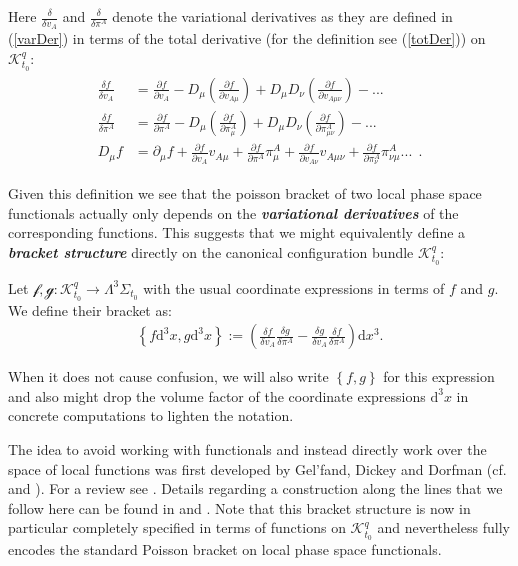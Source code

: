 Here $\frac{\delta}{\delta v_A}$ and $\frac{\delta}{\delta \pi^A}$ denote the variational derivatives as they are defined in (\ref{varDer}) in terms of the total derivative (for the definition see (\ref{totDer})) on $\mathcal{K}^q_{t_0}$:
\begin{align}
    \begin{aligned}
    \frac{\delta f}{\delta v_A} &= \frac{\partial f}{\partial v_A} - D_{\mu}(\frac{\partial f}{\partial v_{A\mu}}) + D_{\mu}D_{\nu} (\frac{\partial f}{\partial v_{A\mu\nu}}) - ... \\
    \frac{\delta f}{\delta \pi^A} &= \frac{\partial f}{\partial \pi^A} - D_{\mu}(\frac{\partial f}{\partial \pi^{A}_{\mu}}) + D_{\mu}D_{\nu} (\frac{\partial f}{\partial \pi^{A}_{\mu\nu}}) - ... \\
    D_\mu f &= \partial _\mu f + \frac{\partial f}{\partial v_A} v_{A\mu} + \frac{\partial f}{\partial \pi^A } \pi ^{A}_{ \mu} + \frac{\partial f}{\partial v_{A\nu}} v_{A\mu \nu} + \frac{\partial f}{\partial \pi^{A}_ {\nu}}\pi^{A}_{ \nu \mu} ... \ \ .
    \end{aligned}
\end{align}

Given this definition we see that the poisson bracket of two local phase space functionals actually only depends on the \textit{\textbf{variational derivatives}} of the corresponding functions. This suggests that we might equivalently define a \textit{\textbf{bracket structure}} directly on the canonical configuration bundle $\mathcal{K}^q_{t_0}$:
\begin{definition}
Let $\mathcal{f},\mathcal{g} : \mathcal{K}^q_{t_0} \rightarrow \Lambda^3\Sigma_{t_0} $ with the usual coordinate expressions in terms of $f$ and $g$. We define their bracket as: 
\begin{align}
    \left \{ f \mathrm{d}^3x,g\mathrm{d}^3x\right \} := \left ( \frac{\delta f}{\delta v_A} \frac{\delta g}{\delta \pi^A} - \frac{\delta g}{\delta v_A} \frac{\delta f}{\delta \pi^A} \right ) \mathrm{d}x^3  .
\end{align}
\end{definition}
\begin{remark}
When it does not cause confusion, we will also write $\left \{ f ,g\right \}$ for this expression and also might drop the volume factor of the coordinate expressions $\mathrm{d}^3x$ in concrete computations to lighten the notation. 
\end{remark}
The idea to avoid working with functionals and instead directly work over the space of local functions was first developed by Gel'fand, Dickey and Dorfman (cf. \cite{Gelfand1976} and \cite{Gelfand1979}). For a review see \cite{doi:10.1142/5108}.
Details regarding a construction along the lines that we follow here can be found in \cite{1997hep.th....9164B} and \cite{Barnich1998}. 
Note that this bracket structure is now in particular completely specified in terms of functions on $\mathcal{K}^q_{t_0}$ and nevertheless fully encodes the standard Poisson bracket on local phase space functionals. 

